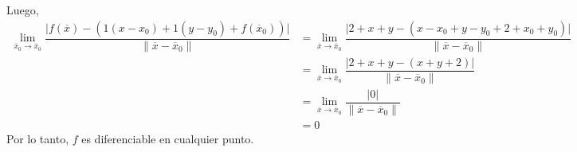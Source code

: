 \documentclass[fleqn]{article}
\begin{document}
\begin{enumerate}
        Luego,
        \begin{align*}
            \lim_{\overline{x}_0 \to \overline{x}_0} \dfrac{\lvert f(\overline{x}) - (1(x - x_0) + 1(y - y_0) + f(\overline{x}_0)) \rvert}{\lVert \overline{x} - \overline{x}_0 \rVert} &= \lim_{\overline{x} \to \overline{x}_0} \dfrac{\lvert 2 + x + y - (x - x_0 + y - y_0 + 2 + x_0 + y_0) \rvert}{\lVert \overline{x} - \overline{x}_0 \rVert} \\
            &= \lim_{\overline{x} \to \overline{x}_0} \dfrac{\lvert 2 + x + y - (x + y + 2) \rvert}{\lVert \overline{x} - \overline{x}_0 \rVert} \\
            &= \lim_{\overline{x} \to \overline{x}_0} \dfrac{\lvert 0 \rvert}{\lVert \overline{x} - \overline{x}_0 \rVert} \\
            &= 0
        \end{align*}
        Por lo tanto, $ f $ es diferenciable en cualquier punto.


\end{enumerate}
\end{document}

